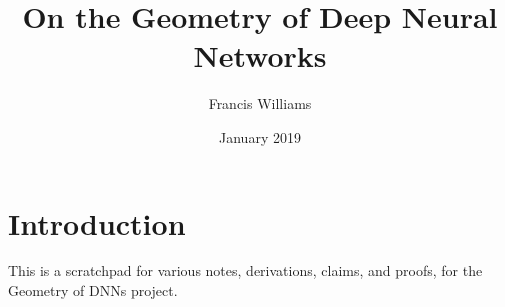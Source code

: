 \documentclass{article}
\title{On the Geometry of Deep Neural Networks}
\author{Francis Williams}
\date{January 2019}
\theoremstyle{definition}
\theoremstyle{claim}
\theoremstyle{corollary}
\theoremstyle{theorem}
\theoremstyle{remark}
\begin{document}
\setlength\parindent{0pt}

\newcommand{\R}{\mathbb{R}}
\newcommand{\N}{\mathcal{N}}
\newcommand{\relu}[1]{[ #1 ]_{+}}
\newcommand{\relusub}[2]{[ #1 ]_{+, #2}}
\newcommand{\sign}{\text{sign}}
\newcommand{\diag}[1]{\text{diag}( #1 )}
\newcommand{\spm}{s^{\prime}}
\newcommand{\todo}[1]{{\color{red} TODO: #1 }}
\maketitle

\section{Introduction}
This is a scratchpad for various notes, derivations, claims, and proofs, for the Geometry of DNNs project. 



{}

\end{document}
